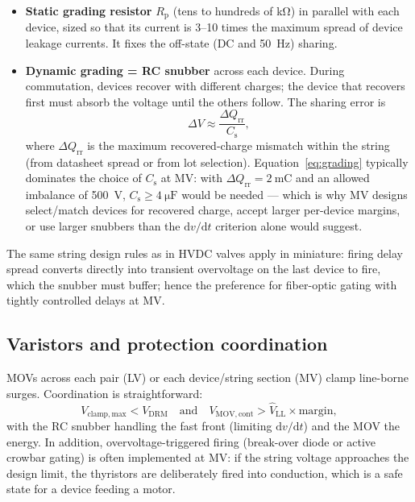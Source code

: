 \documentclass[11pt,a4paper]{article}
\begin{document}
\begin{itemize}
  \item \textbf{Static grading resistor} $R_\mathrm{p}$ (tens to hundreds of
        \si{\kilo\ohm}) in parallel with each device, sized so that its
        current is 3--10 times the maximum spread of device leakage
        currents. It fixes the off-state (DC and \SI{50}{\hertz}) sharing.
  \item \textbf{Dynamic grading = RC snubber} across each device. During
        commutation, devices recover with different charges; the device that
        recovers first must absorb the voltage until the others follow. The
        sharing error is
        \begin{equation}
          \Delta V \approx \frac{\Delta Q_\mathrm{rr}}{C_\mathrm{s}},
          \label{eq:grading}
        \end{equation}
        where $\Delta Q_\mathrm{rr}$ is the maximum recovered-charge
        mismatch within the string (from datasheet spread or from lot
        selection). Equation~\eqref{eq:grading} typically dominates the
        choice of $C_\mathrm{s}$ at MV: with
        $\Delta Q_\mathrm{rr} = \SI{2}{\milli\coulomb}$ and an allowed
        imbalance of \SI{500}{\volt}, $C_\mathrm{s} \geq
        \SI{4}{\micro\farad}$ would be needed --- which is why MV designs
        select/match devices for recovered charge, accept larger per-device
        margins, or use larger snubbers than the $\mathrm{d}v/\mathrm{d}t$
        criterion alone would suggest.
\end{itemize}

The same string design rules as in HVDC valves apply in miniature: firing
delay spread converts directly into transient overvoltage on the last
device to fire, which the snubber must buffer; hence the preference for
fiber-optic gating with tightly controlled delays at MV.

\subsection{Varistors and protection coordination}

MOVs across each pair (LV) or each device/string section (MV) clamp
line-borne surges. Coordination is straightforward:
\begin{equation}
  V_\mathrm{clamp,max} < V_\mathrm{DRM}
  \quad\text{and}\quad
  V_\mathrm{MOV,cont} > \hat{V}_\mathrm{LL}\times\text{margin},
\end{equation}
with the RC snubber handling the fast front (limiting
$\mathrm{d}v/\mathrm{d}t$) and the MOV the energy. In addition,
overvoltage-triggered firing (break-over diode or active crowbar gating) is
often implemented at MV: if the string voltage approaches the design limit,
the thyristors are deliberately fired into conduction, which is a safe state
for a device feeding a motor.
\end{document}
